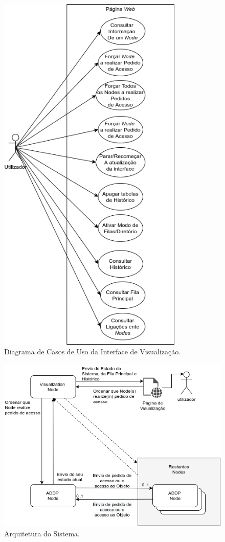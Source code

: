\begin{figure}[ht]
\centering
\includegraphics[width=250pt]{use_case_diagram.png}
\caption{Diagrama de Casos de Uso da Interface de Visualização.}
\label{engenharia:img:casos_de_uso}
\end{figure}

\begin{figure}[ht]
\centering
\includegraphics[width=400pt]{arquitetura.png}
\caption{Arquitetura do Sistema.}
\label{engenharia:img:arquitetura}
\end{figure}

